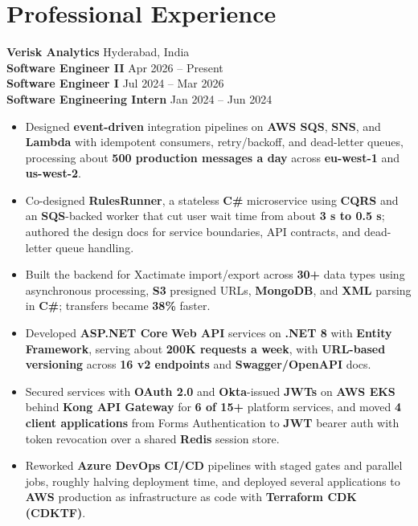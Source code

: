 \documentclass[a4paper,10pt]{article}
\begin{document}
\section*{Professional Experience}

\textbf{Verisk Analytics} \hfill Hyderabad, India \\
\textbf{Software Engineer II} \hfill Apr 2026 -- Present \\
\textbf{Software Engineer I} \hfill Jul 2024 -- Mar 2026 \\
\textbf{Software Engineering Intern} \hfill Jan 2024 -- Jun 2024

\begin{itemize}[leftmargin=*]
    \item Designed \textbf{event-driven} integration pipelines on \textbf{AWS SQS}, \textbf{SNS}, and \textbf{Lambda} with idempotent consumers, retry/backoff, and dead-letter queues, processing about \textbf{500 production messages a day} across \textbf{eu-west-1} and \textbf{us-west-2}.
    \item Co-designed \textbf{RulesRunner}, a stateless \textbf{C\#} microservice using \textbf{CQRS} and an \textbf{SQS}-backed worker that cut user wait time from about \textbf{3 s to 0.5 s}; authored the design docs for service boundaries, API contracts, and dead-letter queue handling.
    \item Built the backend for Xactimate import/export across \textbf{30+} data types using asynchronous processing, \textbf{S3} presigned URLs, \textbf{MongoDB}, and \textbf{XML} parsing in \textbf{C\#}; transfers became \textbf{38\%} faster.
    \item Developed \textbf{ASP.NET Core} \textbf{Web API} services on \textbf{.NET 8} with \textbf{Entity Framework}, serving about \textbf{200K requests a week}, with \textbf{URL-based versioning} across \textbf{16 v2 endpoints} and \textbf{Swagger/OpenAPI} docs.
    \item Secured services with \textbf{OAuth 2.0} and \textbf{Okta}-issued \textbf{JWTs} on \textbf{AWS EKS} behind \textbf{Kong API Gateway} for \textbf{6 of 15+} platform services, and moved \textbf{4 client applications} from Forms Authentication to \textbf{JWT} bearer auth with token revocation over a shared \textbf{Redis} session store.
    \item Reworked \textbf{Azure DevOps} \textbf{CI/CD} pipelines with staged gates and parallel jobs, roughly halving deployment time, and deployed several applications to \textbf{AWS} production as infrastructure as code with \textbf{Terraform CDK (CDKTF)}.

\end{itemize}
\end{document}
